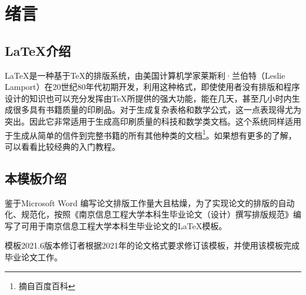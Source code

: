 
\section{绪言}

\subsection{\LaTeX 介绍}

\LaTeX 是一种基于\TeX 的排版系统，由美国计算机学家莱斯利·兰伯特（Leslie Lamport）在20世纪80年代初期开发，利用这种格式，即使使用者没有排版和程序设计的知识也可以充分发挥由\TeX 所提供的强大功能，能在几天，甚至几小时内生成很多具有书籍质量的印刷品。对于生成复杂表格和数学公式，这一点表现得尤为突出。因此它非常适用于生成高印刷质量的科技和数学类文档。这个系统同样适用于生成从简单的信件到完整书籍的所有其他种类的文档\footnote{摘自百度百科}。如果想有更多的了解，可以看看比较经典的入门教程\cite{x1}。

\subsection{本模板介绍}

鉴于Microsoft Word 编写论文排版工作量大且枯燥，为了实现论文的排版的自动化、规范化，按照《南京信息工程大学本科生毕业论文（设计）撰写排版规范》编写了可用于南京信息工程大学本科生毕业论文的\LaTeX 模板。

模板2021.6版本修订者根据2021年的论文格式要求修订该模板，并使用该模板完成毕业论文工作。
